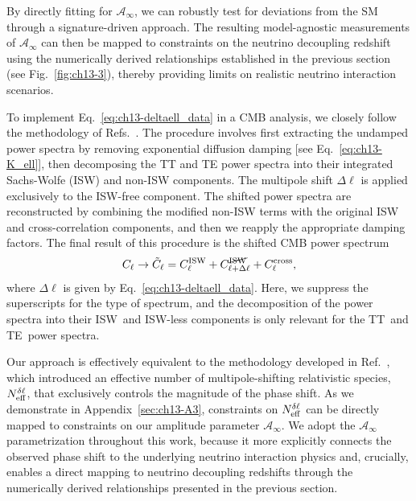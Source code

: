 By directly fitting for $\mathcal{A}_\infty$, we can robustly test for deviations from the SM through a signature-driven approach. The resulting model-agnostic measurements of $\mathcal{A}_\infty$ can then be mapped to constraints on the neutrino decoupling redshift using the numerically derived relationships established in the previous section (see Fig.~\ref{fig:ch13-3}), thereby providing limits on realistic neutrino interaction scenarios.

To implement Eq.~\eqref{eq:ch13-deltaell_data} in a CMB analysis, we closely follow the methodology of Refs.~\cite{Follin:2015hya, Montefalcone:2025unv}. The procedure involves first extracting the undamped power spectra by removing exponential diffusion damping [see Eq.~\eqref{eq:ch13-K_ell}], then decomposing the TT and TE power spectra into their integrated Sachs-Wolfe (ISW) and non-ISW components. The multipole shift $\Delta\ell$ is applied exclusively to the ISW-free component. The shifted power spectra are reconstructed by combining the modified non-ISW terms with the original ISW and cross-correlation components, and then we reapply the appropriate damping factors. The final result of this procedure is the shifted CMB power spectrum
\begin{equation}
    C_\ell\rightarrow \tilde{C}_\ell= C_\ell^{\rm ISW}+C_{\ell+\Delta\ell}^{\cancel{\rm ISW}}+C_\ell^{\rm cross}, \label{eq:ch13-deltaCell_data}
\end{equation}
where $\Delta\ell$ is given by Eq.~\eqref{eq:ch13-deltaell_data}. Here, we suppress the superscripts for the type of spectrum, and the decomposition of the power spectra into their ISW~and ISW-less components is only relevant for the TT~and TE~power spectra.

Our approach is effectively equivalent to the methodology developed in Ref.~\cite{Montefalcone:2025unv}, which introduced an effective number of multipole-shifting relativistic species, $N_\mathrm{eff}^{\delta\ell}$, that exclusively controls the magnitude of the phase shift. As we demonstrate in Appendix~\ref{sec:ch13-A3}, constraints on $N_\mathrm{eff}^{\delta\ell}$ can be directly mapped to constraints on our amplitude parameter $\mathcal{A}_\infty$. We adopt the $\mathcal{A}_\infty$ parametrization throughout this work, because it more explicitly connects the observed phase shift to the underlying neutrino interaction physics and, crucially, enables a direct mapping to neutrino decoupling redshifts through the numerically derived relationships presented in the previous section.

